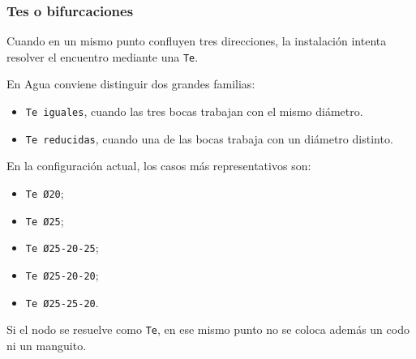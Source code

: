 \documentclass[12pt,a4paper]{article}
\begin{document}
\subsubsection{Tes o bifurcaciones}

Cuando en un mismo punto confluyen tres direcciones, la instalación intenta resolver el encuentro mediante una \texttt{Te}.

En Agua conviene distinguir dos grandes familias:

\begin{itemize}
\item \texttt{Te iguales}, cuando las tres bocas trabajan con el mismo diámetro.
\item \texttt{Te reducidas}, cuando una de las bocas trabaja con un diámetro distinto.
\end{itemize}

En la configuración actual, los casos más representativos son:

\begin{itemize}
\item \texttt{Te Ø20};
\item \texttt{Te Ø25};
\item \texttt{Te Ø25-20-25};
\item \texttt{Te Ø25-20-20};
\item \texttt{Te Ø25-25-20}.
\end{itemize}

Si el nodo se resuelve como \texttt{Te}, en ese mismo punto no se coloca además un codo ni un manguito.
\end{document}
